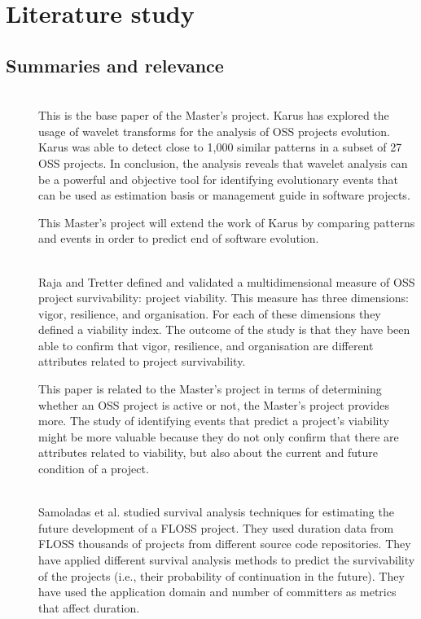 \section{Literature study}

\subsection{Summaries and relevance}

\begin{description}
	\item[\cite{karus2013}] \hfill \\
		This is the base paper of the Master's project.
		Karus has explored the usage of wavelet transforms for the analysis of OSS
		projects evolution. Karus was able to detect close to 1,000 similar patterns
		in a subset of 27 OSS projects. In conclusion, the analysis reveals that
		wavelet analysis can be a powerful and objective tool for identifying
		evolutionary events that can be used as estimation basis or management guide
		in software projects.
		
		This Master's project will extend the work of Karus by comparing
		patterns and events in order to predict end of software evolution.

	\item[\cite{raja2012}] \hfill \\
		Raja and Tretter defined and validated a multidimensional measure of OSS
		project survivability: project viability. This measure has three dimensions:
		vigor, resilience, and organisation. For each of these dimensions they defined
		a viability index. The outcome of the study is that they have been able to
		confirm that vigor, resilience, and organisation are different attributes
		related to project survivability.
		
		This paper is related to the Master's project in terms of determining whether
		an OSS project is active or not, the Master's project provides more. The study
		of identifying events that predict a project's viability might be more
		valuable because they do not only confirm that there are attributes related
		to viability, but also about the current and future condition of a project.

	\item[\cite{samoladas2010}] \hfill \\
		Samoladas et al. studied survival analysis techniques for estimating the
		future development of a FLOSS project. They used duration data from FLOSS
		thousands of projects from different source code repositories. They have
		applied different survival analysis methods to predict the survivability of
		the projects (i.e., their probability of continuation in the future). They
		have used the application domain and number of committers as metrics that
		affect duration.
		

\end{description}
